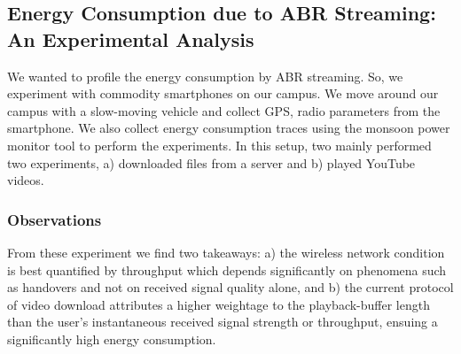 \subsection{Energy Consumption due to ABR Streaming: An Experimental Analysis}
We wanted to profile the energy consumption by ABR streaming. So, we experiment with commodity smartphones on our campus. We move around our campus with a slow-moving vehicle and collect GPS, radio parameters from the smartphone. We also collect energy consumption traces using the monsoon power monitor tool to perform the experiments. In this setup, two mainly performed two experiments, a) downloaded files from a server and b) played YouTube videos.
\subsubsection{Observations}
From these experiment we find two takeaways: a) the wireless network condition is best quantified by throughput which depends significantly on phenomena such as handovers and not on received signal quality alone, and b) the current protocol of video download attributes a higher weightage to the playback-buffer length than the user’s instantaneous received signal strength or throughput, ensuing a significantly high energy consumption.